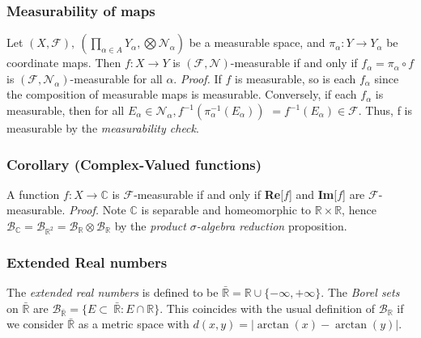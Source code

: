 \documentclass{article}
\begin{document}
\subsubsection{Measurability of maps}
Let $(X,\mathcal{F}), \ (\prod_{\alpha\in A}Y_\alpha, \bigotimes\mathcal{N}_\alpha)$ be a measurable space, and $\pi_\alpha:Y\to Y_\alpha$ be coordinate maps. Then $f:X\to Y$ is $(\mathcal{F},\mathcal{N})$-measurable if and only if $f_\alpha=\pi_\alpha \circ f$ is $(\mathcal{F},\mathcal{N}_\alpha)$-measurable for all $\alpha$. \newline \newline
\textit{Proof.} \newline \newline
If $f$ is measurable, so is each $f_\alpha$ since the composition of measurable maps is measurable. Conversely, if each $f_\alpha$ is measurable, then for all $E_\alpha\in \mathcal{N}_\alpha, $$ f^{-1}(\pi_\alpha^{-1}(E_\alpha)) $ $= f^{-1}(E_\alpha)\in \mathcal{F}$. Thus, f is measurable by the \emph{measurability check}.
\newline \newline


\subsubsection{Corollary (Complex-Valued functions)}
A function $f:X\to \mathbb{C}$ is $\mathcal{F}$-measurable if and only if \textbf{Re}[$f$] and \textbf{Im}[$f$] are $\mathcal{F}$-measurable.\newline \newline
\textit{Proof.}\newline \newline
Note $\mathbb{C}$ is separable and homeomorphic to $\mathbb{R}\times\mathbb{R}$, hence $\mathcal{B}_\mathbb{C}=\mathcal{B}_{\mathbb{R}^2}=\mathcal{B}_\mathbb{R}\otimes\mathcal{B}_\mathbb{R}$ by the \emph{product $\sigma$-algebra reduction} proposition.

\subsubsection{Extended Real numbers}
The \emph{extended real numbers} is defined to be $\bar{\mathbb{R}}=\mathbb{R}\cup\{-\infty,+\infty\}$. The \emph{Borel sets} on $\bar{\mathbb{R}}$ are $\mathcal{B}_{\bar{\mathbb{R}}}= \{E\subset\ \bar{\mathbb{R}}:E\cap\mathbb{R}\}$. This coincides with the usual definition of $\mathcal{B}_\mathbb{R}$ if we consider $\bar{\mathbb{R}}$ as a metric space with $d(x,y)=|\arctan(x)-\arctan(y)|$. 
\end{document}
